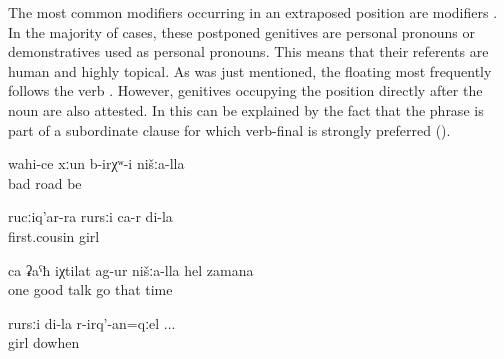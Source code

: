 The most common modifiers occurring in an extraposed position are  modifiers . In the majority of cases, these postponed genitives are personal pronouns or demonstratives used as personal pronouns. This means that their referents are human and highly topical. As was just mentioned, the floating  most frequently follows the verb . However, genitives occupying the position directly after the noun are also attested. In  this can be explained by the fact that the  phrase is part of a subordinate clause for which verb-final  is strongly preferred ().
%
\begin{exe}
	\ex	\label{ex:There was a bad road in our (area)}
	\gll	wahi-ce	xːun	b-irχʷ-i	nišːa-lla\\
		bad	road	be	\\
	\glt	{}

	\ex	\label{ex:(She) is the daughter of my cousin}
	\gll	rucːiq'ar-ra	rursːi	ca-r	di-la\\
		first.cousin	girl		\\
	\glt	{}

	\ex	\label{ex:‎We had a good conversation at that time}
	\gll	ca	ʡaˁħ	iχtilat	ag-ur	nišːa-lla	hel	zamana\\
		one	good	talk	go		that	time\\
	\glt	{}

	\ex	\label{ex:when I gave birth to my daughter}
	\gll	rursːi	di-la	r-irq'-an=qːel ...\\
		girl		dowhen\\
	\glt	{}
\end{exe}

